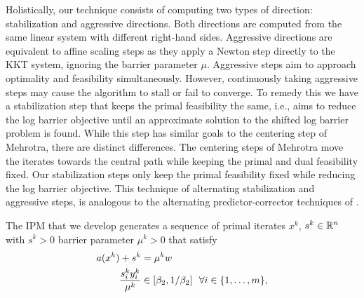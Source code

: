 \documentclass{article}
\begin{document}




Holistically, our technique consists of computing two types of direction: stabilization and aggressive directions. Both directions are computed from the same linear system with different right-hand sides. Aggressive directions are equivalent to affine scaling steps \cite{mehrotra1992implementation} as they apply a Newton step directly to the KKT system, ignoring the barrier parameter $\mu$. Aggressive steps aim to approach optimality and feasibility simultaneously. However, continuously taking aggressive steps may cause the algorithm to stall or fail to converge. To remedy this we have a stabilization step that keeps the primal feasibility the same, i.e., aims to reduce the log barrier objective until an approximate solution to the shifted log barrier problem is found. While this step has similar goals to the centering step of Mehrotra, there are distinct differences. The centering steps of Mehrotra move the iterates towards the central path while keeping the primal and dual feasibility fixed. Our stabilization steps only keep the primal feasibility fixed while reducing the log barrier objective. This technique of alternating stabilization and aggressive steps, is analogous to the alternating predictor-corrector techniques of \citet*[Algorithm~1]{mizuno1993adaptive}.



The IPM that we develop generates a sequence of primal iterates $x^{k}$, $s^{k} \in \mathbb{R}^{n}$ with $s^k > 0$ barrier parameter $\mu^k > 0$ that satisfy
\begin{subequations}\label{eq:barrier-primal-sequence-nice}
\begin{flalign}
a(x^{k}) + s^{k} &= \mu^k w  \label{eq:primal-feasibility} \\
\frac{s^{k}_i y^{k}_i}{\mu^{k}} &\in [ \beta_{2}, 1 / \beta_{2}] ~~ \forall i \in \{ 1, \dots, m \},\label{eq:comp-slack} 
\end{flalign} 
\end{subequations}
\end{document}
